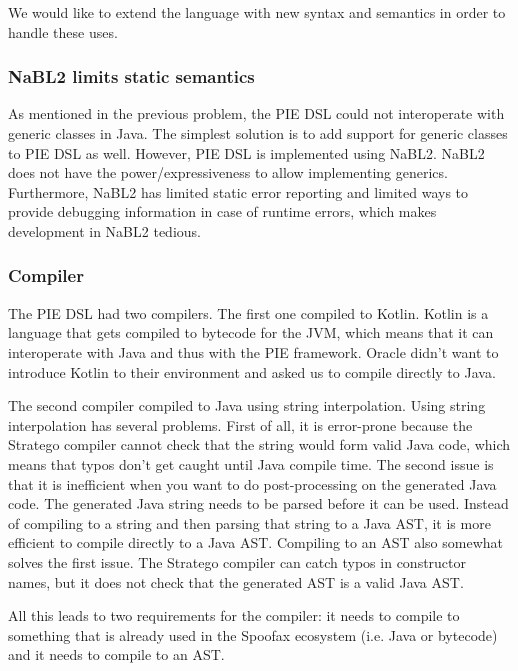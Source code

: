 We would like to extend the language with new syntax and semantics in order to handle these uses.

\subsubsection{NaBL2 limits static semantics}
\label{subsubsec:problem_analysis__problems__nabl2}

As mentioned in the previous problem,  the \ac{PIE} \ac{DSL} could not interoperate with generic classes in Java.
The simplest solution is to add support for generic classes to \ac{PIE} \ac{DSL} as well.
However, \ac{PIE} \ac{DSL} is implemented using NaBL2.
NaBL2 does not have the power/expressiveness to allow implementing generics.
Furthermore, NaBL2 has limited static error reporting and limited ways to provide debugging information in case of runtime errors, which makes development in NaBL2 tedious.

\subsubsection{Compiler}
\label{subsubsec:problem_analysis__problems__compiler}

The \ac{PIE} \ac{DSL} had two compilers.
The first one compiled to Kotlin.
Kotlin is a language that gets compiled to bytecode for the JVM, which means that it can interoperate with Java and thus with the \ac{PIE} framework.
Oracle didn't want to introduce Kotlin to their environment and asked us to compile directly to Java.

The second compiler compiled to Java using string interpolation.
Using string interpolation has several problems.
First of all, it is error-prone because the Stratego compiler cannot check that the string would form valid Java code, which means that typos don't get caught until Java compile time.
The second issue is that it is inefficient when you want to do post-processing on the generated Java code.
The generated Java string needs to be parsed before it can be used.
Instead of compiling to a string and then parsing that string to a Java AST, it is more efficient to compile directly to a Java AST.
Compiling to an AST also somewhat solves the first issue.
The Stratego compiler can catch typos in constructor names, but it does not check that the generated AST is a valid Java AST.

All this leads to two requirements for the compiler: it needs to compile to something that is already used in the Spoofax ecosystem (i.e. Java or bytecode) and it needs to compile to an AST.

